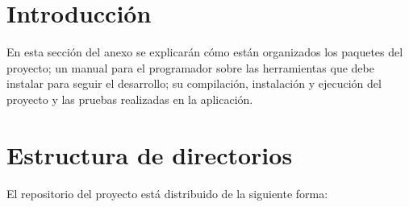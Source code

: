 
\section{Introducción}

En esta sección del anexo se explicarán cómo están organizados los paquetes del proyecto; un manual para el programador sobre las herramientas que debe instalar para seguir el desarrollo; su compilación, instalación y ejecución del proyecto y las pruebas realizadas en la aplicación.

\section{Estructura de directorios}

El repositorio del proyecto está distribuido de la siguiente forma:


